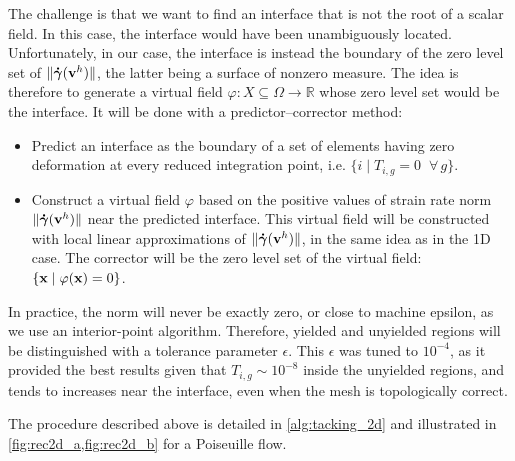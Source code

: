 \documentclass[11 pt]{report}
\begin{document}
The challenge is that we want to find an interface that is not the root of a scalar field. In this case, the interface would have been unambiguously located. Unfortunately, in our case, the interface is instead the boundary of the zero level set of $\|\boldsymbol{\dot \gamma}(\mathbf{v}^h)\|$, the latter being a surface of nonzero measure. The idea is therefore to generate a virtual field $\varphi: X \subseteq \Omega \to \mathbb{R}$ whose zero level set would be the interface. It will be done with a predictor–corrector method:
\begin{itemize}
    \item Predict an interface as the boundary of a set of elements having zero deformation at every reduced integration point, i.e. $\{i \;\vert\; T_{i,g} = 0 \;\; \forall\, g\}$.
    \item Construct a virtual field $\varphi$ based on the positive values of strain rate norm $\|\boldsymbol{\dot \gamma}(\mathbf{v}^h)\|$ near the predicted interface. This virtual field will be constructed with local linear approximations of $\|\boldsymbol{\dot \gamma}(\mathbf{v}^h)\|$, in the same idea as in the 1D case. The corrector will be the zero level set of the virtual field: $\{\mathbf{x} \; \vert\; \varphi(\mathbf{x}) = 0\}$.
\end{itemize}

In practice, the norm will never be exactly zero, or close to machine epsilon, as we use an interior-point algorithm. Therefore, yielded and unyielded regions will be distinguished with a tolerance parameter $\epsilon$. This $\epsilon$ was tuned to $10^{-4}$, as it provided the best results given that $T_{i,g} \sim 10^{-8}$ inside the unyielded regions, and tends to increases near the interface, even when the mesh is topologically correct.

The procedure described above is detailed in \cref{alg:tacking_2d} and illustrated in \cref{fig:rec2d_a,fig:rec2d_b} for a Poiseuille flow. %
\vspace{12pt}
\end{document}
